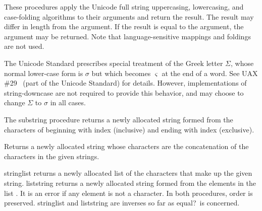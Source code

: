 \begin{entry}{%
}


These procedures apply the Unicode full string uppercasing, lowercasing,
and case-folding algorithms to their arguments and return the result.
The result may differ in length from the argument.  
If the result is equal to the argument, the argument may be returned.
Note that language-sensitive mappings and foldings are not used.  

The Unicode Standard prescribes special treatment of the Greek letter
$\Sigma$, whose normal lower-case form is $\sigma$ but which becomes
$\varsigma$ at the end of a word.  See UAX \#29~\cite{uax29} (part of
the Unicode Standard) for details.  However, implementations of {\cf
string-downcase} are not required to provide this behavior, and may
choose to change $\Sigma$ to $\sigma$ in all cases.

\end{entry}


\begin{entry}{%
}

The {\cf substring} procedure returns a newly allocated string formed from the characters of
 beginning with index  (inclusive) and ending with index
 (exclusive).
\end{entry}


\begin{entry}{%
}

Returns a newly allocated string whose characters are the concatenation of the
characters in the given strings.

\end{entry}


\begin{entry}{%
}

{\cf string\coerce{}list} returns a newly allocated list of the
characters that make up the given string.  {\cf list\coerce{}string}
returns a newly allocated string formed from the elements in the list
.  It is an error if any element is not a character.
In both procedures, order is preserved.
{\cf string\coerce{}list}
and {\cf list\coerce{}string} are
inverses so far as {\cf equal?}\ is concerned.  

\end{entry}


